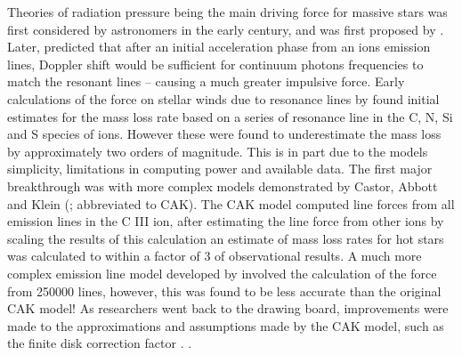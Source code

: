 Theories of radiation pressure being the main driving force for massive stars was first considered by astronomers in the early  century, and was first proposed by \textcite{sahaRadiationPressureQuantumTheory1919}.
Later, \textcite{milnePossibilityEmissionHighspeed1926} predicted that after an initial acceleration phase from an ions emission lines, Doppler shift would be sufficient for continuum photons frequencies to match the resonant lines -- causing a much greater impulsive force.
Early calculations of the force on stellar winds due to resonance lines by \textcite{lucy_mass_1970} found initial estimates for the mass loss rate based on a series of resonance line in the C, N, Si and S species of ions.
However these were found to underestimate the mass loss by approximately two orders of magnitude.
This is in part due to the models simplicity, limitations in computing power and available data.
The first major breakthrough was with more complex models demonstrated by Castor, Abbott and Klein (\citeyear{castor_radiation-driven_1975}; abbreviated to CAK).
The CAK model computed line forces from all emission lines in the C III ion, after estimating the line force from other ions by scaling the results of this calculation an estimate of mass loss rates for hot stars was calculated to within a factor of 3 of observational results.
A much more complex emission line model developed by \textcite{1982ApJ...259..282A} involved the calculation of the force from \num{250000} lines, however, this was found to be less accurate than the original CAK model!
As researchers went back to the drawing board, improvements were made to the approximations and assumptions made by the CAK model, such as the finite disk correction factor
\parencite{friend_theory_1986,pauldrachRadiationdrivenWindsHot1986}.
.

